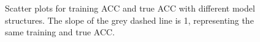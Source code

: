 \documentclass[12pt]{article}
\begin{document}
            \begin{figure}[htpb]
                \centering
                \caption{Scatter plots for training ACC and true ACC with different model structures. The slope of the grey dashed line is 1, representing the same training and true ACC.}
                \label{fig:acc_scatter_ZN_model}
            \end{figure}
\end{document}
